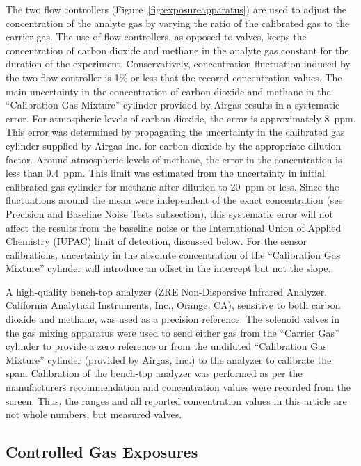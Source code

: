 \documentclass[times]{joehreview}
\begin{document}
	
	The two flow controllers (Figure~\ref{fig:exposureapparatus}) are used to adjust the concentration of the analyte gas by varying the ratio of the calibrated gas to the carrier gas.  The use of flow controllers, as opposed to valves, keeps the concentration of carbon dioxide and methane in the analyte gas constant for the duration of the experiment.  Conservatively, concentration fluctuation induced by the two flow controller is 1\% or less that the recored concentration values.	The main uncertainty in the concentration of carbon dioxide and methane in the ``Calibration Gas Mixture'' cylinder provided by Airgas results in a systematic error.  For atmospheric levels of carbon dioxide, the error is approximately 8~ppm.  This error was determined by propagating the uncertainty in the calibrated gas cylinder supplied by Airgas Inc. for carbon dioxide by the appropriate dilution factor.  Around atmospheric levels of methane, the error in the concentration is less than 0.4~ppm. This limit was estimated from the uncertainty in initial calibrated gas cylinder for methane after dilution to 20~ppm or less. Since the fluctuations around the mean were independent of the exact concentration (see Precision and Baseline Noise Tests subsection), this systematic error will not affect the results from the baseline noise or the International Union of Applied Chemistry (IUPAC) limit of detection, discussed below.  For the sensor calibrations, uncertainty in the absolute concentration of the ``Calibration Gas Mixture'' cylinder will introduce an offset in the intercept but not the slope. 
	
	A high-quality bench-top analyzer (ZRE Non-Dispersive Infrared Analyzer, California Analytical Instruments, Inc., Orange, CA), sensitive to both carbon dioxide and methane, was used as a precision reference.  The solenoid valves in the gas mixing apparatus were used to send either gas from the ``Carrier Gas'' cylinder to provide a zero reference or from the undiluted ``Calibration Gas Mixture'' cylinder (provided by Airgas, Inc.) to the analyzer to calibrate the span.  Calibration of the bench-top analyzer was performed as per the manufacturer\'s recommendation and concentration values were recorded from the screen.  Thus, the ranges and all reported concentration values in this article are not whole numbers, but measured valves.  
	
	\subsection*{Controlled Gas Exposures }
	
\end{document}
